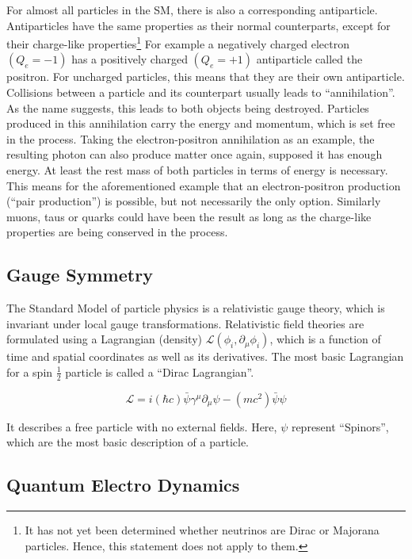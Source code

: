 For almost all particles in the SM, there is also a corresponding antiparticle. Antiparticles have the same properties as their normal counterparts, except for their charge-like properties\footnote{It has not yet been determined whether neutrinos are Dirac or Majorana particles. Hence, this statement does not apply to them.} For example a negatively charged electron $(Q_e = -1)$ has a positively charged $(Q_e = +1)$ antiparticle called the positron. For uncharged particles, this means that they are their own antiparticle. Collisions between a particle and its counterpart usually leads to ``annihilation''. As the name suggests, this leads to both objects being destroyed. Particles produced in this annihilation carry the energy and momentum, which is set free in the process. Taking the electron-positron annihilation as an example, the resulting photon can also produce matter once again, supposed it has enough energy. At least the rest mass of both particles in terms of energy is necessary. This means for the aforementioned example that an electron-positron production (``pair production'') is possible, but not necessarily the only option. Similarly muons, taus or quarks could have been the result as long as the charge-like properties are being conserved in the process.


\subsection{Gauge Symmetry}

The Standard Model of particle physics is a relativistic gauge theory, which is invariant under local gauge transformations. Relativistic field theories are formulated using a Lagrangian (density) $\mathcal{L} ( \phi_i, \partial_\mu \phi_i )$, which is a function of time and spatial coordinates as well as its derivatives. The most basic Lagrangian for a spin $\frac{1}{2}$ particle is called a ``Dirac Lagrangian''.

\begin{equation}
  \label{eq:diraclagrangian}
  \mathcal{L} = i (\hbar c) \bar{\psi} \gamma^\mu \partial_\mu \psi - (m c^2) \bar{\psi} \psi
\end{equation}

\noindent It describes a free particle with no external fields. Here, $\psi$ represent ``Spinors'', which are the most basic description of a particle.

\subsection{Quantum Electro Dynamics}
\label{sec:qed}

